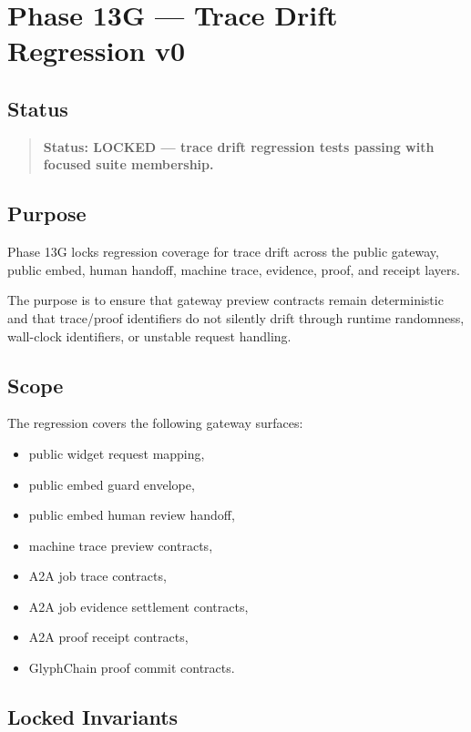 \section{Phase 13G --- Trace Drift Regression v0}
\label{sec:aion-phase13g-trace-drift-regression-v0}

\subsection{Status}

\begin{quote}
\textbf{Status: LOCKED --- trace drift regression tests passing with focused suite membership.}
\end{quote}

\subsection{Purpose}

Phase 13G locks regression coverage for trace drift across the public gateway,
public embed, human handoff, machine trace, evidence, proof, and receipt layers.

The purpose is to ensure that gateway preview contracts remain deterministic and
that trace/proof identifiers do not silently drift through runtime randomness,
wall-clock identifiers, or unstable request handling.

\subsection{Scope}

The regression covers the following gateway surfaces:

\begin{itemize}
  \item public widget request mapping,
  \item public embed guard envelope,
  \item public embed human review handoff,
  \item machine trace preview contracts,
  \item A2A job trace contracts,
  \item A2A job evidence settlement contracts,
  \item A2A proof receipt contracts,
  \item GlyphChain proof commit contracts.
\end{itemize}

\subsection{Locked Invariants}

